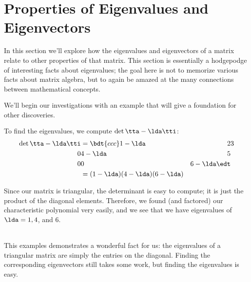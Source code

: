 \section{Properties of Eigenvalues and Eigenvectors}\label{sec:eigen_prop}


In this section we'll explore how the eigenvalues and eigenvectors of a matrix relate to other properties of that matrix. This section is essentially a hodgepodge of interesting facts about eigenvalues; the goal here is not to memorize various facts about matrix algebra, but to again be amazed at the many connections between mathematical concepts.

We'll begin our investigations with an example that will give a foundation for other discoveries.

\medskip

{
To find the eigenvalues, we compute $\det{\tta-\lda\tti}$:
\begin{align*}
\det{\tta-\lda\tti}	&=	\bdt{ccc} 1-\lda & 2&3\\0&4-\lda&5\\0&0&6-\lda \edt\\
										&= (1-\lda)(4-\lda)(6-\lda)
\end{align*}

Since our matrix is triangular, the determinant is easy to compute; it is just the product of the diagonal elements. Therefore, we found (and factored) our characteristic polynomial very easily, and we see that we have eigenvalues of $\lda = 1, 4$, and 6.
}\\

This examples demonstrates a wonderful fact for us: the eigenvalues of a triangular matrix are simply the entries on the diagonal. Finding the corresponding eigenvectors still takes some work, but finding the eigenvalues is easy.


